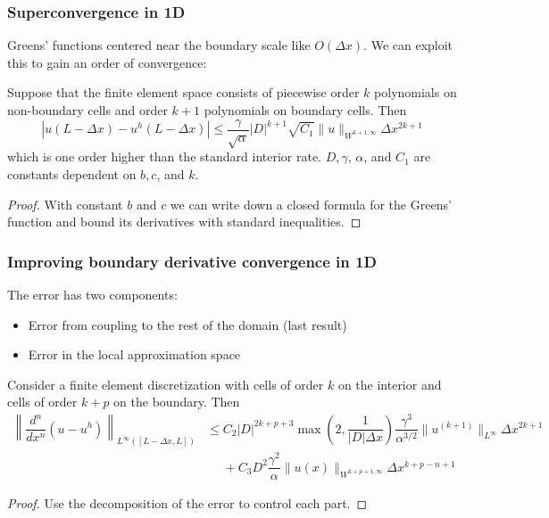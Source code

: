 \documentclass[8pt]{beamer}
\begin{document}
\begin{frame}
    \frametitle{Superconvergence in 1D}
    Greens' functions centered near the boundary scale like \(O(\Delta x)\). We
    can exploit this to gain an order of convergence:
    \begin{theorem}
        Suppose that the finite element space consists of piecewise order \(k\)
        polynomials on non-boundary cells and order \(k + 1\) polynomials on
        boundary cells. Then
        \begin{equation*}
            |u(L - \Delta x) - u^h(L - \Delta x)|
            \leq
            \dfrac{\gamma}{\sqrt{\alpha}} |D|^{k + 1} \sqrt{C_1}
            \|u\|_{W^{k + 1,\infty}} \Delta x^{2 k + 1}
        \end{equation*}
        which is one order higher than the standard interior rate. \(D,
        \gamma\), \(\alpha\), and \(C_1\) are constants dependent on \(b, c\),
        and \(k\).
    \end{theorem}

    \begin{proof}
        With constant \(b\) and \(c\) we can write down a closed formula for the
        Greens' function and bound its derivatives with standard inequalities.
    \end{proof}
\end{frame}

\begin{frame}
    \frametitle{Improving boundary derivative convergence in 1D}
    The error has two components:
    \begin{itemize}
        \item Error from coupling to the rest of the domain (last result)
        \item Error in the local approximation space
    \end{itemize}
    \pause

    \begin{theorem}
        Consider a finite element discretization with cells of order \(k\)
        on the interior and cells of order \(k + p\) on the boundary. Then
        \begin{align*}
            \left\|
            \dfrac{d^n}{dx^n}\left(u - u^h\right)
            \right\|_{L^\infty([L - \Delta x, L])}
            \nonumber
            &\leq
            C_2 |D|^{2 k + p + 3} \max\left(2, \dfrac{1}{|D|\Delta x}\right)
            \dfrac{\gamma^3}{\alpha^{3/2}}
            \|u^{(k + 1)}\|_{L^\infty} \Delta x^{2 k + 1}                     \\
            &\phantom{\leq}
            +
            C_3
            D^2 \dfrac{\gamma^2}{\alpha}
            \|u(x)\|_{W^{k + p + 1, \infty}}
            \Delta x^{k + p - n + 1}
        \end{align*}
    \end{theorem}

    \begin{proof}
        Use the decomposition of the error to control each part.
    \end{proof}
\end{frame}
\end{document}
